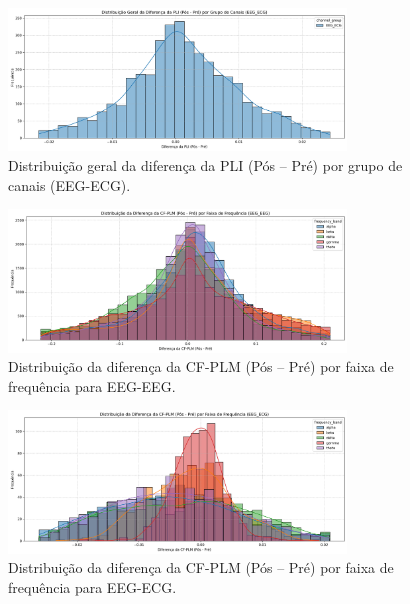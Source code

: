 \begin{figure}[htb]
    \centering
    \includegraphics[width=0.8\textwidth]{figs/6_distribuicao_metricas_conectividade/Distribuição_Geral_da_Diferença_da_PLI_(Pós_-_Pré)_por_Grupo_de_Canais_EEG_ECG.png}
    \caption{Distribuição geral da diferença da PLI (Pós -- Pré) por grupo de canais (EEG-ECG).}
    \label{fig:pli_channel_eeg_ecg}
\end{figure}

\begin{figure}[htb]
    \centering
    \includegraphics[width=0.8\textwidth]{figs/6_distribuicao_metricas_conectividade/Distribuição_da_Diferença_da_CF-PLM_(Pós_-_Pré)_por_Faixa_de_Frequência_EEG_EEG.png}
    \caption{Distribuição da diferença da CF-PLM (Pós -- Pré) por faixa de frequência para EEG-EEG.}
    \label{fig:cf_plm_freq_eeg_eeg}
\end{figure}

\begin{figure}[htb]
    \centering
    \includegraphics[width=0.8\textwidth]{figs/6_distribuicao_metricas_conectividade/Distribuição_da_Diferença_da_CF-PLM_(Pós_-_Pré)_por_Faixa_de_Frequência_EEG_ECG.png}
    \caption{Distribuição da diferença da CF-PLM (Pós -- Pré) por faixa de frequência para EEG-ECG.}
    \label{fig:cf_plm_freq_eeg_ecg}
\end{figure}

